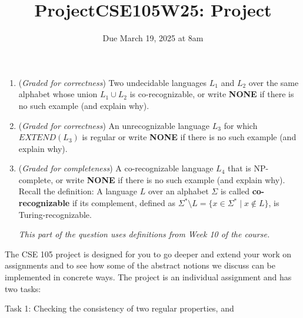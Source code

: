 \documentclass[12pt, oneside]{article}
\newcommand{\gradeCorrect}{({\it Graded for correctness}) }
\newcommand{\gradeComplete}{({\it Graded for completeness}) }
\begin{document}
\begin{enumerate}[wide, labelwidth=!, labelindent=0pt]
\begin{enumerate}
    \item\gradeCorrect Two undecidable languages $L_1$ and $L_2$ over the same alphabet
        whose union $L_1 \cup L_2$ is co-recognizable, or write {\bf NONE}
        if there is no such example (and explain why).
    
    \item\gradeCorrect An unrecognizable
        language $L_3$ for which $EXTEND(L_3)$ is regular
        or write {\bf NONE} if there is no such example (and explain why).
    
    
    \item\gradeComplete A co-recognizable language $L_4$ that is NP-complete,
         or write {\bf NONE} if there is no such example (and explain why).
        Recall the definition: A language $L$ over an  alphabet $\Sigma$ is called {\bf co-recognizable} if its complement,  defined
        as $\Sigma^* \setminus L  = \{ x  \in  \Sigma^* \mid x \notin  L \}$, is Turing-recognizable.

        {\it This part of the question uses definitions from Week 10 of the course.}
        
\end{enumerate}
    

\end{enumerate}
\newpage
\titleformat{\subsubsection}[runin]
   {\normalfont\bfseries}{}{}{}
   
\title{ProjectCSE105W25: Project}
\date{Due March 19, 2025 at 8am}


\maketitle

\thispagestyle{fancy}


\vspace{-20pt}

The CSE 105 project is designed for you to go deeper and 
extend your work on assignments 
and to see how some of the abstract notions we discuss can 
be implemented in concrete ways. 
The project is an individual assignment and has two tasks: 

Task 1: Checking the consistency of two regular properties, and

\vspace{-15pt}
\end{document}
